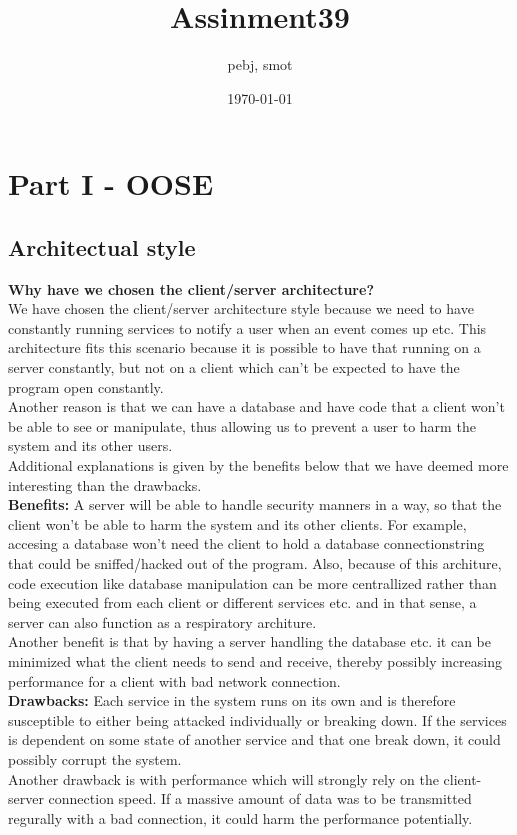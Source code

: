 \documentclass[a4paper]{article}
\title{Assinment39}
\author{pebj, smot}
\date{\today}
\begin{document}
\maketitle

\section{Part I - OOSE}
\subsection{Architectual style}

\textbf{Why have we chosen the client/server architecture?}\\
We have chosen the client/server architecture style because we need to have constantly running services to notify a user when an event comes up etc. This architecture fits this scenario because it is possible to have that running on a server constantly, but not on a client which can't be expected to have the program open constantly.\\
Another reason is that we can have a database and have code that a client won't be able to see or manipulate, thus allowing us to prevent a user to harm the system and its other users. \\
Additional explanations is given by the benefits below that we have deemed more interesting than the drawbacks.\\

\textbf{Benefits:}
A server will be able to handle security manners in a way, so that the client won't be able to harm the system and its other clients. For example, accesing a
database won't need the client to hold a database connectionstring that could be sniffed/hacked out of the program. Also, because of
this architure, code execution like database manipulation can be more centrallized rather than being executed from each client or different services etc. and in that sense, a server can also function as a respiratory architure.\\
Another benefit is that by having a server handling the database etc. it can be minimized what the client needs to send and receive, thereby possibly increasing performance for a client with bad network connection.\\

\textbf{Drawbacks:}
Each service in the system runs on its own and is therefore susceptible to either being attacked individually or breaking down.
If the services is dependent on some state of another service and that one break down, it could possibly corrupt the system.\\
Another drawback is with performance which will strongly rely on the client-server connection speed. If a massive amount of data was
to be transmitted regurally with a bad connection, it could harm the performance potentially.\\
\end{document}
